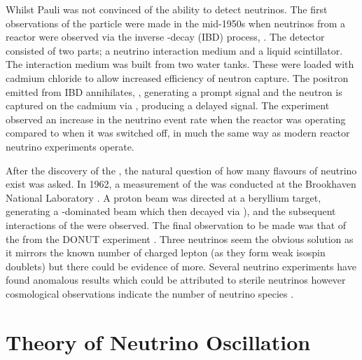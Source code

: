 Whilst Pauli was not convinced of the ability to detect neutrinos. The first observations of the particle were made in the mid-1950s when neutrinos from a reactor were observed via the inverse \quickmath{\beta}-decay (IBD) process,  \cite{reines_cowan_1,reines_cowan_2}.
The detector consisted of two parts; a neutrino interaction medium and a liquid scintillator. The interaction medium was built from two water tanks. These were loaded with cadmium chloride to allow increased efficiency of neutron capture. The positron emitted from IBD annihilates, , generating a prompt signal and the neutron is captured on the cadmium via , producing a delayed signal. The experiment observed an increase in the neutrino event rate when the reactor was operating compared to when it was switched off, in much the same way as modern reactor neutrino experiments operate.

After the discovery of the , the natural question of how many flavours of neutrino exist was asked. In 1962, a measurement of the \quickmath{\nu_{\mu}} was conducted at the Brookhaven National Laboratory \cite{Lederman}. A proton beam was directed at a beryllium target, generating a \quickmath{\pi}-dominated beam which then decayed via \quickmath{\pi^{\pm} \rightarrow \mu^{\pm} + (\nu_{\mu}, \bar{\nu}_\mu}), and the subsequent interactions of the \quickmath{\nu_{\mu}} were observed. The final observation to be made was that of the \quickmath{\nu_{\tau}} from the DONUT experiment \cite{tau_nu_disc}. Three neutrinos seem the obvious solution as it mirrors the known number of charged lepton (as they form weak isospin doublets) but there could be evidence of more. Several neutrino experiments have found anomalous results \cite{PhysRevD.64.112007, PhysRevLett.110.161801} which could be attributed to sterile neutrinos however cosmological observations indicate the number of neutrino species  \cite{Planck2015}.

\section{Theory of Neutrino Oscillation}
\label{sec:NeutrinoOscillationPhysics_EvidenceForNeutrinoOscillation}

